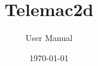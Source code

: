 \documentclass[Telemac2D]{../../data/TelemacDoc} %
\begin{document}
\let\cleardoublepage\clearpage

\title{Telemac2d}
\subtitle{User Manual}
\version{\telmaversion}
\date{\today}
\maketitle
\clearpage



\newpage

\thispagestyle{empty}

\TelemacCopyright{}




\pagestyle{empty} %

\tableofcontents%


\pagestyle{fancy} %
\end{document}
